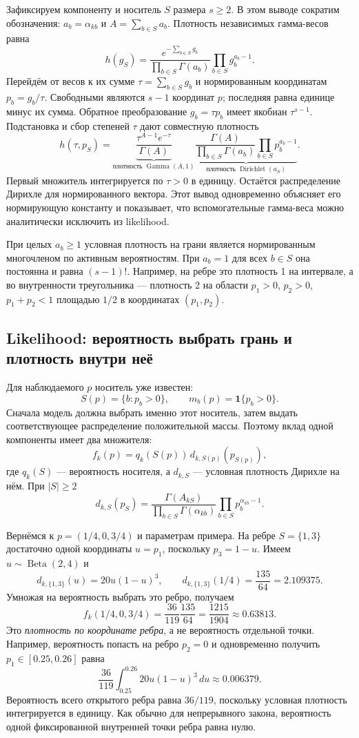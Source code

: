 \documentclass[11pt,a4paper]{article}
\begin{document}
Зафиксируем компоненту и носитель $S$ размера $s\geq2$.
В этом выводе сократим обозначения: $a_b=\alpha_{kb}$ и
$A=\sum_{b\in S}a_b$.
Плотность независимых гамма-весов равна
\[
 h(g_S)=\frac{e^{-\sum_{b\in S}g_b}}{\prod_{b\in S}\Gamma(a_b)}
              \prod_{b\in S}g_b^{a_b-1}.
\]
Перейдём от весов к их сумме $\tau=\sum_{b\in S}g_b$ и нормированным
координатам $p_b=g_b/\tau$. Свободными являются $s-1$ координат $p$; последняя
равна единице минус их сумма. Обратное преобразование $g_b=\tau p_b$
имеет якобиан $\tau^{s-1}$.
Подстановка и сбор степеней $\tau$ дают совместную плотность
\[
 h(\tau,p_S)=
 \underbrace{\frac{\tau^{A-1}e^{-\tau}}{\Gamma(A)}}_{
                   \text{плотность }\operatorname{Gamma}(A,1)}
 \underbrace{\frac{\Gamma(A)}{\prod_{b\in S}\Gamma(a_b)}
                   \prod_{b\in S}p_b^{a_b-1}}_{
                   \text{плотность }\operatorname{Dirichlet}(a_S)}.
\]
Первый множитель интегрируется по $\tau>0$ в единицу.
Остаётся распределение Дирихле для нормированного вектора.
Этот вывод одновременно объясняет его нормирующую константу и показывает,
что вспомогательные гамма-веса можно аналитически исключить из likelihood.

При целых $a_b\geq1$ условная плотность на грани является нормированным
многочленом по активным вероятностям. При $a_b=1$ для всех $b\in S$
она постоянна и равна $(s-1)!$. Например, на ребре это плотность 1
на интервале, а во внутренности треугольника --- плотность 2 на области
$p_1>0$, $p_2>0$, $p_1+p_2<1$ площадью $1/2$ в координатах $(p_1,p_2)$.

\subsection{Likelihood: вероятность выбрать грань и плотность внутри неё}

Для наблюдаемого $p$ носитель уже известен:
\[
 S(p)=\{b:p_b>0\},\qquad m_b(p)=\mathbf1\{p_b>0\}.
\]
Сначала модель должна выбрать именно этот носитель, затем выдать
соответствующее распределение положительной массы. Поэтому вклад
одной компоненты имеет два множителя:
\[
 \boxed{\displaystyle
 f_k(p)=q_k(S(p))\,d_{k,S(p)}(p_{S(p)})},
\]
где $q_k(S)$ --- вероятность носителя, а $d_{k,S}$ --- условная плотность
Дирихле на нём. При $|S|\geq2$
\[
 d_{k,S}(p_S)=
 \frac{\Gamma(A_{kS})}{\prod_{b\in S}\Gamma(\alpha_{kb})}
 \prod_{b\in S}p_b^{\alpha_{kb}-1}.
\]

Вернёмся к $p=(1/4,0,3/4)$ и параметрам примера.
На ребре $S=\{1,3\}$ достаточно одной координаты $u=p_1$, поскольку
$p_3=1-u$. Имеем $u\sim\operatorname{Beta}(2,4)$ и
\[
 d_{k,\{1,3\}}(u)=20u(1-u)^3,\qquad
 d_{k,\{1,3\}}(1/4)=\frac{135}{64}=2.109375.
\]
Умножая на вероятность выбрать это ребро, получаем
\[
 f_k(1/4,0,3/4)=\frac{36}{119}\frac{135}{64}
              =\frac{1215}{1904}\approx0.63813.
\]
Это \emph{плотность по координате ребра}, а не вероятность отдельной
точки. Например, вероятность попасть на ребро $p_2=0$ и одновременно
получить $p_1\in[0.25,0.26]$ равна
\[
 \frac{36}{119}\int_{0.25}^{0.26}20u(1-u)^3\,du
 \approx0.006379.
\]
Вероятность всего открытого ребра равна $36/119$, поскольку условная
плотность интегрируется в единицу. Как обычно для непрерывного закона,
вероятность одной фиксированной внутренней точки ребра равна нулю.
\end{document}

